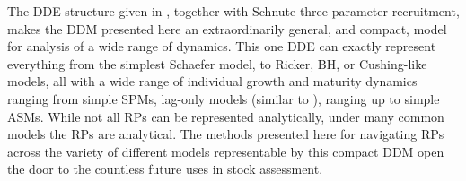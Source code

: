
%
The DDE structure given in \cite{walters_continuous_2020, deriso_harvesting_1980, schnute_general_1985}, 
together with Schnute three-parameter recruitment, makes the DDM presented 
here an extraordinarily general, and compact, model for analysis of a wide 
range of dynamics. This one DDE can exactly represent everything from the 
simplest Schaefer model, to Ricker, BH, or Cushing-like models, all with a 
wide range of individual growth and maturity dynamics ranging from simple SPMs, 
lag-only models (similar to \cite{dick_depletion-based_2011}), ranging up to 
simple ASMs. While not all RPs can be represented analytically, under many 
common models the RPs are analytical. The methods presented here for navigating RPs
across the variety of different models representable by this compact DDM
open the door to the countless future uses in stock assessment. 



